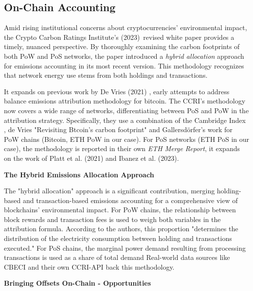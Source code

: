 \documentclass[11pt]{report}
\begin{document}
\subsection{On-Chain Accounting \label{se:onchain-accounting}}

Amid rising institutional concerns about cryptocurrencies' environmental impact, the Crypto Carbon Ratings Institute's (2023)\ revised white paper provides a timely, nuanced perspective. By thoroughly examining the carbon footprints of both PoW and PoS networks, the paper introduced a \textit{hybrid allocation} approach for emissions accounting in its most recent version. This methodology recognizes that network energy use stems from both holdings and transactions.

It expands on previous work by De Vries (2021) \cite{devriesTrueCostsDigital2021}, early attempts to address balance emissions attribution methodology for bitcoin. The CCRI's methodology now covers a wide range of networks, differentiating between PoS and PoW in the attribution strategy. Specifically, they use a combination of the Cambridge Index \cite{neumuellerCambridgeBitcoinElectricity2021}, de Vries "Revisiting Btcoin's carbon footprint" \cite{devriesRevisitingBitcoinCarbon2022} and Gallersdörfer's work \cite{gallersdorferEnergyConsumptionCryptocurrencies2020} for PoW chains (Bitcoin, ETH PoW in our case). For PoS networks (ETH PoS in our case), the methodology is reported in their own \textit{ETH Merge Report}\cite{ETHMergeReport}, it expands on the work of Platt et al. (2021)\cite{plattEnergyFootprintBlockchain2021} and Ibanez et al. (2023)\cite{ibanezEnergyConsumptionProofofStake2023}.

\textbf{The Hybrid Emissions Allocation Approach}

The "hybrid allocation" approach is a significant contribution, merging holding-based and transaction-based emissions accounting for a comprehensive view of blockchains' environmental impact. For PoW chains, the relationship between block rewards and transaction fees is used to weigh both variables in the attribution formula. According to the authors, this proportion "determines the distribution of the electricity consumption between holding and transactions executed." For PoS chains, the marginal power demand resulting from processing transactions is used as a share of total demand Real-world data sources like CBECI and their own CCRI-API back this methodology.


\textbf{Bringing Offsets On-Chain - Opportunities}
\end{document}
